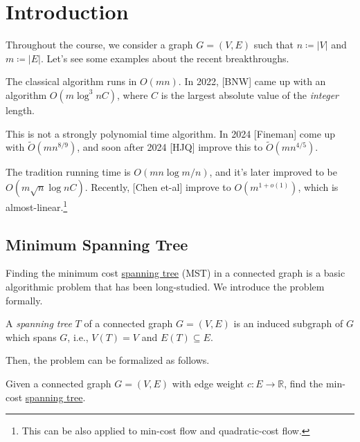 \chapter{Introduction}
Throughout the course, we consider a graph \(G=(V, E)\) such that \(n \coloneqq \lvert V \rvert \) and \(m\coloneqq \lvert E \rvert \). Let's see some examples about the recent breakthroughs.

\begin{eg}
	The classical algorithm runs in \(O(mn)\). In 2022, [BNW] came up with an algorithm \(O(m \log ^3 n C)\), where \(C\) is the largest absolute value of the \emph{integer} length.

	This is not a strongly polynomial time algorithm. In 2024 [Fineman] come up with \(\widetilde{O} (m n^{8 / 9})\), and soon after 2024 [HJQ] improve this to \(\widetilde{O} (m n^{4 / 5})\).
\end{eg}

\begin{eg}[\(s\)-\(t\) maxflow]
	The tradition running time is \(O(mn \log m / n)\), and it's later improved to be \(O(m \sqrt{n} \log n C)\). Recently, [Chen et-al] improve to \(O(m^{1 + o(1)})\), which is almost-linear.\footnote{This can be also applied to min-cost flow and quadratic-cost flow.}
\end{eg}

\section{Minimum Spanning Tree}
Finding the minimum cost \hyperref[def:spanning-tree]{spanning tree} (MST) in a connected graph is a basic algorithmic problem that has been long-studied. We introduce the problem formally.

\begin{definition}\label{def:spanning-tree}
	A \emph{spanning tree} \(T\) of a connected graph \(G =(V, E)\) is an induced subgraph of \(G\) which spans \(G\), i.e., \(V(T) = V\) and \(E(T) \subseteq E\).
\end{definition}

Then, the problem can be formalized as follows.

\begin{problem}\label{prb:MST}
Given a connected graph \(G=(V, E)\) with edge weight \(c \colon E \to \mathbb{R} \), find the min-cost \hyperref[def:spanning-tree]{spanning tree}.
\end{problem}

